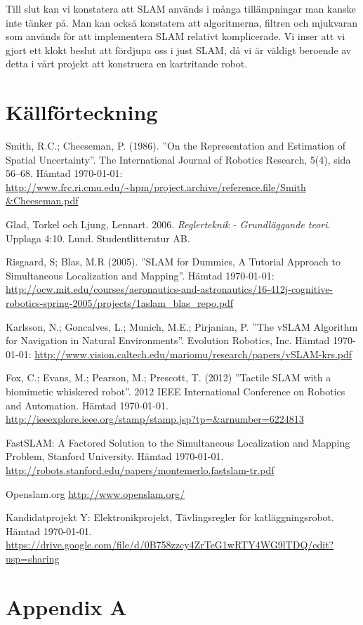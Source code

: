 \documentclass[a4paper,12pt,fleqn]{article}
\begin{document}
Till slut kan vi konstatera att SLAM används i många tillämpningar man kanske inte tänker på. Man kan också konstatera att algoritmerna, filtren och mjukvaran som används för att implementera SLAM relativt komplicerade. Vi inser att vi gjort ett klokt beslut att fördjupa oss i just SLAM, då vi är väldigt beroende av detta i vårt projekt att konstruera en kartritande robot. 

\newpage \section{Källförteckning} Smith, R.C.; Cheeseman, P. (1986).
''On the Representation and Estimation of Spatial Uncertainty''. The
International Journal of Robotics Research, 5(4), sida 56–68. Hämtad
\today:
\url{http://www.frc.ri.cmu.edu/~hpm/project.archive/reference.file/Smith
&Cheeseman.pdf}

Glad, Torkel och Ljung, Lennart. 2006. \textit{Reglerteknik - Grundläggande teori}. Upplaga 4:10. Lund. Studentlitteratur AB.

Risgaard, S; Blas, M.R (2005).
''SLAM for Dummies, A Tutorial Approach to Simultaneous Localization and Mapping''. 
Hämtad \today:
\url{http://ocw.mit.edu/courses/aeronautics-and-astronautics/16-412j-cognitive-robotics-spring-2005/projects/1aslam_blas_repo.pdf}

Karlsson, N.; Goncalves, L.; Munich, M.E.; Pirjanian, P.
''The vSLAM Algorithm for Navigation in Natural Environments''. Evolution Robotics, Inc. Hämtad \today:
\url{http://www.vision.caltech.edu/mariomu/research/papers/vSLAM-krs.pdf}

Fox, C.; Evans, M.; Pearson, M.; Prescott, T. (2012)
''Tactile SLAM with a biomimetic whiskered robot''. 2012 IEEE International Conference on Robotics and Automation. Hämtad \today.
\url{http://ieeexplore.ieee.org/stamp/stamp.jsp?tp=&arnumber=6224813}

FastSLAM: A Factored Solution to the Simultaneous
Localization and Mapping Problem, Stanford University. Hämtad \today.
\url{http://robots.stanford.edu/papers/montemerlo.fastslam-tr.pdf}

Openslam.org
\url{http://www.openslam.org/}

Kandidatprojekt Y: Elektronikprojekt, Tävlingsregler för katläggningsrobot. Hämtad \today.  \url{https://drive.google.com/file/d/0B758zzcy4ZrTeG1wRTY4WG9lTDQ/edit?usp=sharing}

% 
\newpage \appendix \pagestyle{empty}
 \section{Appendix A}
\end{document}
